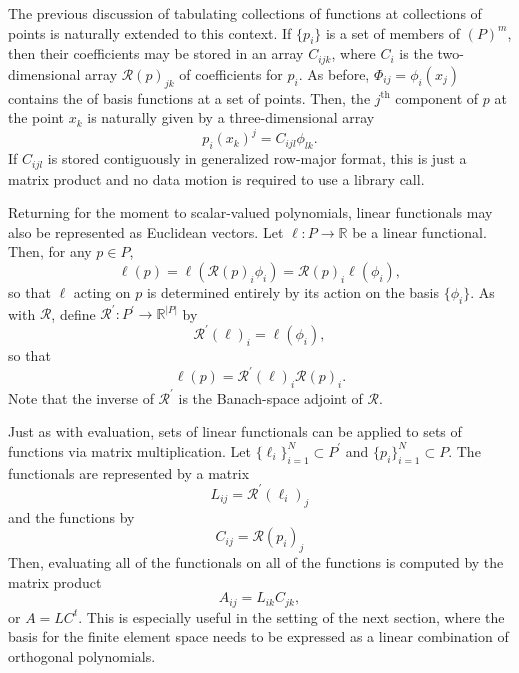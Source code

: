 The previous discussion of tabulating collections of functions at
collections of points is naturally extended to this context.  If \( \{ p_i
\} \) is a set of members of \( (P)^m \), then their coefficients may be
stored in an array \( C_{ijk} \), where \( C_i \) is the two-dimensional
array \( \mathcal{R}(p)_{jk} \) of coefficients for \( p_i \).  As before,
\( \Phi_{ij} = \phi_i(x_j) \) contains the of basis functions at a set
of points.  Then, the \( j^\mathrm{th} \) component of \( p \) at the
point \( x_k \) is naturally given by a three-dimensional array
\[
p_i(x_k)^j = C_{ijl} \phi_{lk}.
\]
If \( C_{ijl} \) is stored contiguously in generalized row-major format,
this is just a matrix product and no data motion is required to
use a library call.

Returning for the moment to scalar-valued polynomials, linear functionals
may also be represented as Euclidean vectors.  Let \( \ell: P \rightarrow
\mathbb{R} \) be a linear functional.  Then, for any \( p \in P \),
\[
\ell( p ) = \ell( \mathcal{R}(p)_i \phi_i )
= \mathcal{R}(p)_i \ell( \phi_i ),
\]
so that \( \ell \) acting on \( p \) is determined entirely by its
action on the basis \( \{ \phi_i \} \).  As with \( \mathcal{R} \), define
\( \mathcal{R}^\prime : P^\prime \rightarrow \mathbb{R}^{|P|} \) by
\[
  \mathcal{R}^\prime (\ell)_i
= \ell( \phi_i),
\]
so that
\[
\ell(p) = \mathcal{R}^\prime(\ell)_i\mathcal{R}(p)_i.
\]
Note that the inverse of \( \mathcal{R}^\prime \) is the Banach-space
adjoint of \( \mathcal{R} \).

Just as with evaluation, sets of linear functionals can be applied
to sets of functions via matrix multiplication.  Let \( \{ \ell_i
\}_{i=1}^N \subset P^\prime \) and \( \{ p_i \}_{i=1}^N \subset P \).
The functionals are represented by a matrix
\[
L_{ij} = \mathcal{R}^\prime(\ell_i)_j
\]
and the functions by
\[
C_{ij} = \mathcal{R}(p_i)_j
\]
Then, evaluating all of the functionals on all of the functions is
computed by the matrix product
\begin{equation}
A_{ij} = L_{ik}C_{jk},
\end{equation}
or \( A = L C^t \).  This is especially useful in the setting of the
next section, where the basis for the finite element space needs to be
expressed as a linear combination of orthogonal polynomials.

